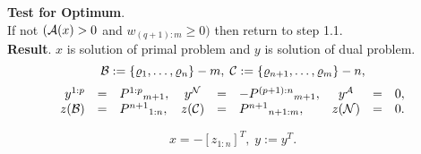 {\bf Test for Optimum}.\\
If not $(\A(x) > 0$ and $w_{(q+1):m} \geq 0)$ then
return to step 1.1.\\
{\bf Result}. $x$ is solution of primal problem and $y$ is solution of dual
problem.
\[
\B := \{\rho _1, \ldots,\rho _n\} - m, \;
\C := \{\rho _{n+1}, \ldots, \rho _m\} - n,
\]
\[ \ba{.}{rclcrlcrl}
y^{1:p}&=& P^{1:p}{}_{m+1},& y^{\N} &=& - P^{(p+1):n}{}_{m+1}, &y^{\A} &=&
0,\\
z(\B)  &=&   P^{n+1}{}_{1:n},&z(\C) &=& P^{n+1}{}_{n+1:m}, &  z(\N) &=& 0 .
\ea{.}
\]
\par
\[
x = - [z_{1:n}]^T, \; y := y^T.
\]
